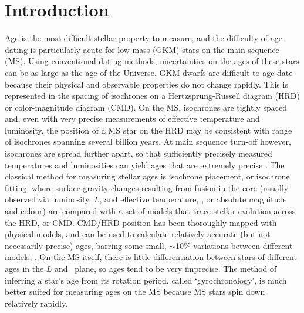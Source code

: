\section{Introduction}
\label{section:intro}

Age is the most difficult stellar property to measure, and the difficulty of
age-dating is particularly acute for low mass (GKM) stars on the main sequence
(MS).
Using conventional dating methods, uncertainties on the ages of these stars
can be as large as the age of the Universe.
GKM dwarfs are difficult to age-date because their physical and observable
properties do not change rapidly.
This is represented in the spacing of isochrones on a Hertzsprung-Russell
diagram (HRD) or color-magnitude diagram (CMD).
On the MS, isochrones are tightly spaced and, even with very precise
measurements of effective temperature and luminosity, the position of a MS
star on the HRD may be consistent with range of isochrones spanning several
billion years.
At main sequence turn-off however, isochrones are spread further apart, so
that sufficiently precisely measured temperatures and luminosities can yield
ages that are extremely precise \citep[\eg][]{pont2004}.
The classical method for measuring stellar ages is isochrone placement, or
isochrone fitting, where surface gravity changes resulting from fusion in the
core (usually observed via luminosity, $L$, and effective temperature, \teff,
or absolute magnitude and colour) are compared with a set of models that trace
stellar evolution across the HRD, or CMD.
CMD/HRD position has been thoroughly mapped with physical models, and can be
used to calculate relatively accurate (but not necessarily precise) ages,
barring some small, $\sim$10\% variations between different models,
\citep[\eg][]{yi2001, dotter2008, dotter2016}.
On the MS itself, there is little differentiation between stars of different
ages in the $L$ and \teff\ plane, so ages tend to be very imprecise.
The method of inferring a star's age from its rotation period, called
`gyrochronology', is much better suited for measuring ages on the MS because
MS stars spin down relatively rapidly.

